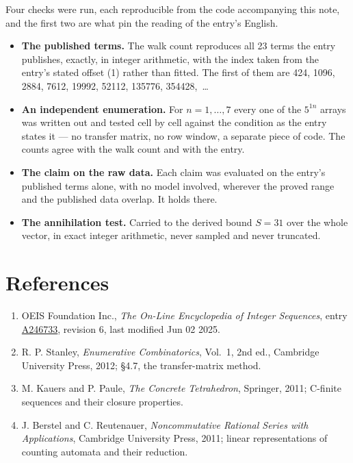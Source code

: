 \documentclass[11pt]{article}
\theoremstyle{definition}
\begin{document}
Four checks were run, each reproducible from the code accompanying this note, and the first two are what pin the reading of the entry's English.

\begin{itemize}

\item {\bfseries The published terms.} The walk count reproduces all 23 terms the entry publishes, exactly, in integer arithmetic, with the index taken from the entry's stated offset (1) rather than fitted. The first of them are 424, 1096, 2884, 7612, 19992, 52112, 135776, 354428,~\dots

\item {\bfseries An independent enumeration.} For $n = 1,\dots,7$ every one of the $5^{1n}$ arrays was written out and tested cell by cell against the condition as the entry states it --- no transfer matrix, no row window, a separate piece of code. The counts agree with the walk count and with the entry.

\item {\bfseries The claim on the raw data.} Each claim was evaluated on the entry's published terms alone, with no model involved, wherever the proved range and the published data overlap. It holds there.

\item {\bfseries The annihilation test.} Carried to the derived bound $S = 31$ over the whole vector, in exact integer arithmetic, never sampled and never truncated.

\end{itemize}

\section{References}

\begin{enumerate}

\item OEIS Foundation Inc., \emph{The On-Line Encyclopedia of Integer Sequences}, entry \href{https://oeis.org/A246733}{A246733}, revision 6, last modified Jun 02 2025.

\item R. P. Stanley, \emph{Enumerative Combinatorics}, Vol.~1, 2nd ed., Cambridge University Press, 2012; \S4.7, the transfer-matrix method.

\item M. Kauers and P. Paule, \emph{The Concrete Tetrahedron}, Springer, 2011; C-finite sequences and their closure properties.

\item J. Berstel and C. Reutenauer, \emph{Noncommutative Rational Series with Applications}, Cambridge University Press, 2011; linear representations of counting automata and their reduction.

\end{enumerate}
\end{document}
